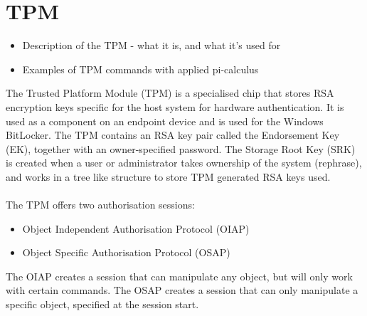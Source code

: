 \section{TPM}
\begin{itemize}
  \item Description of the TPM - what it is, and what it's used for
  \item Examples of TPM commands with applied pi-calculus
\end{itemize}

The Trusted Platform Module (TPM) is a specialised chip that stores RSA encryption keys specific for the host system for hardware authentication. It is used as a component on an endpoint device and is used for the Windows BitLocker.
The TPM contains an RSA key pair called the Endorsement Key (EK), together with an owner-specified password. The Storage Root Key (SRK) is created when a user or administrator takes ownership of the system (rephrase), and works in a tree like structure to store TPM generated RSA keys used. \\ \\
The TPM offers two authorisation sessions:
\begin{itemize}
  \item Object Independent Authorisation Protocol (OIAP)
  \item Object Specific Authorisation Protocol (OSAP)
\end{itemize}
The OIAP creates a session that can manipulate any object, but will only work with certain commands. The OSAP creates a session that can only manipulate a specific object, specified at the session start.